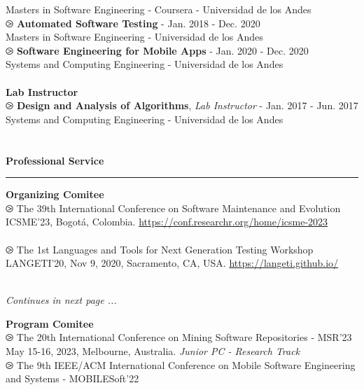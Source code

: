 \documentclass[letterpaper,11pt,oneside]{article}
\begin{document}
\indent Masters in Software Engineering - Coursera - Universidad de los Andes \\
$\ogreaterthan$ \textbf{Automated Software Testing} - Jan. 2018 - Dec. 2020 \\
\indent Masters in Software Engineering - Universidad de los Andes \\
$\ogreaterthan$ \textbf{Software Engineering for Mobile Apps} - Jan. 2020 - Dec. 2020 \\
\indent Systems and Computing Engineering - Universidad de los Andes \\
\\
\noindent \large{\textbf{Lab Instructor}}\\
$\ogreaterthan$ \textbf{Design and Analysis of Algorithms}, \textit{Lab Instructor} - Jan. 2017 - Jun. 2017 \\
\indent Systems and Computing Engineering - Universidad de los Andes \\
\\
\\
\noindent \Large{\textbf{Professional Service}} \\
\vspace{-2ex}
\hrule 
\normalsize
\vspace{2ex}
\noindent \large{\textbf{Organizing Comitee}}\vspace{0.5cm}\\
$\ogreaterthan$ The 39th International Conference on Software Maintenance and Evolution\\
\indent ICSME'23, Bogotá, Colombia. \href{https://conf.researchr.org/home/icsme-2023}{https://conf.researchr.org/home/icsme-2023} \\
\\
$\ogreaterthan$ The 1st Languages and Tools for Next Generation Testing Workshop \\
\indent LANGETI'20, Nov 9, 2020, Sacramento, CA, USA. \href{https://langeti.github.io/}{https://langeti.github.io/} \\
\\
\begin{flushright}
\textit{Continues in next page ...}\
\end{flushright}
\noindent \large{\textbf{Program Comitee}} \\
$\ogreaterthan$ The 20th International Conference on Mining Software Repositories - MSR'23\\
\indent May 15-16, 2023, Melbourne, Australia. \textit{Junior PC - Research Track} \\
$\ogreaterthan$ The 9th IEEE/ACM International Conference on Mobile Software Engineering and Systems - MOBILESoft'22\\
\end{document}
